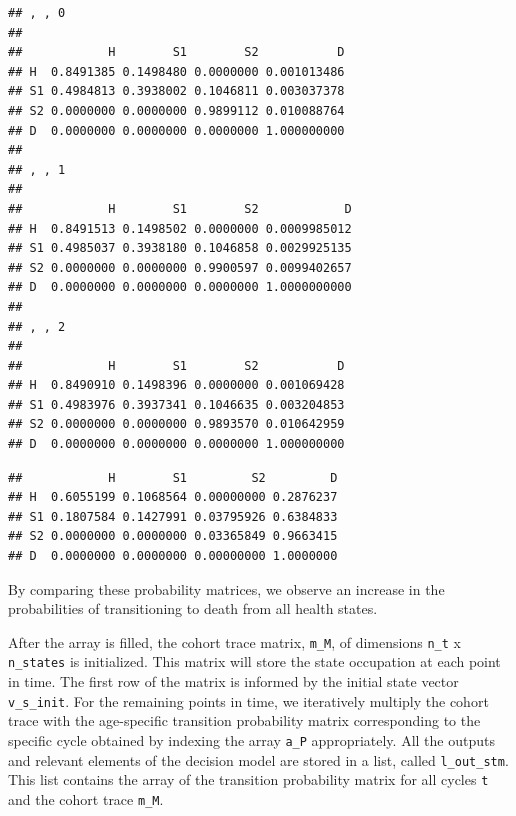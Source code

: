 \documentclass[]{book}
\newenvironment{Shaded}{\begin{snugshade}}{\end{snugshade}}
\newcommand{\CommentTok}[1]{\textcolor[rgb]{0.56,0.35,0.01}{\textit{#1}}}
\newcommand{\DecValTok}[1]{\textcolor[rgb]{0.00,0.00,0.81}{#1}}
\newcommand{\NormalTok}[1]{#1}
\newcommand{\OperatorTok}[1]{\textcolor[rgb]{0.81,0.36,0.00}{\textbf{#1}}}
\begin{document}
\begin{Shaded}
\end{Shaded}

\begin{verbatim}
## , , 0
## 
##            H        S1        S2           D
## H  0.8491385 0.1498480 0.0000000 0.001013486
## S1 0.4984813 0.3938002 0.1046811 0.003037378
## S2 0.0000000 0.0000000 0.9899112 0.010088764
## D  0.0000000 0.0000000 0.0000000 1.000000000
## 
## , , 1
## 
##            H        S1        S2            D
## H  0.8491513 0.1498502 0.0000000 0.0009985012
## S1 0.4985037 0.3938180 0.1046858 0.0029925135
## S2 0.0000000 0.0000000 0.9900597 0.0099402657
## D  0.0000000 0.0000000 0.0000000 1.0000000000
## 
## , , 2
## 
##            H        S1        S2           D
## H  0.8490910 0.1498396 0.0000000 0.001069428
## S1 0.4983976 0.3937341 0.1046635 0.003204853
## S2 0.0000000 0.0000000 0.9893570 0.010642959
## D  0.0000000 0.0000000 0.0000000 1.000000000
\end{verbatim}

\begin{Shaded}
\end{Shaded}

\begin{verbatim}
##            H        S1         S2         D
## H  0.6055199 0.1068564 0.00000000 0.2876237
## S1 0.1807584 0.1427991 0.03795926 0.6384833
## S2 0.0000000 0.0000000 0.03365849 0.9663415
## D  0.0000000 0.0000000 0.00000000 1.0000000
\end{verbatim}

By comparing these probability matrices, we observe an increase in the probabilities of transitioning to death from all health states.

After the array is filled, the cohort trace matrix, \texttt{m\_M}, of dimensions \texttt{n\_t} x \texttt{n\_states} is initialized. This matrix will store the state occupation at each point in time. The first row of the matrix is informed by the initial state vector \texttt{v\_s\_init}. For the remaining points in time, we iteratively multiply the cohort trace with the age-specific transition probability matrix corresponding to the specific cycle obtained by indexing the array \texttt{a\_P} appropriately. All the outputs and relevant elements of the decision model are stored in a list, called \texttt{l\_out\_stm}. This list contains the array of the transition probability matrix for all cycles \texttt{t} and the cohort trace \texttt{m\_M}.
\end{document}
